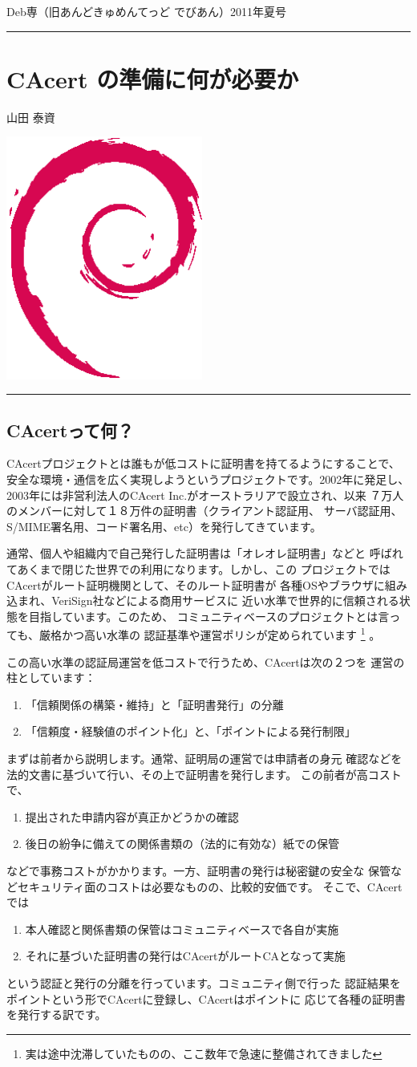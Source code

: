 \documentclass[mingoth,a4paper]{jsarticle}
\renewcommand{\dancersection}[2]{%
\newpage
Deb専（旧あんどきゅめんてっど でびあん）2011年夏号
%
\vspace{0.1mm}\\
{\color{dancerdarkblue}\rule{\hsize}{2mm}}

%
%
\begin{minipage}[t]{0.6\hsize}
\color{dancerdarkblue}
\vspace{1cm}
\section{#1}
\hfill{}#2\\
\end{minipage}
\begin{minipage}[t]{0.4\hsize}
\vspace{-2cm}
\hfill{}\includegraphics[height=8cm]{image200502/openlogo-nd.eps}\\
\vspace{-5cm}
\end{minipage}
%
{\color{dancerlightblue}\rule{0.66\hsize}{2mm}}
%
\vspace{2cm}
}
\begin{document}
\dancersection{CAcert の準備に何が必要か}{山田 泰資}


\subsection{CAcertって何？}
CAcertプロジェクトとは誰もが低コストに証明書を持てるようにすることで、
安全な環境・通信を広く実現しようというプロジェクトです。2002年に発足し、
2003年には非営利法人のCAcert Inc.がオーストラリアで設立され、以来
７万人のメンバーに対して１８万件の証明書（クライアント認証用、
サーバ認証用、S/MIME署名用、コード署名用、etc）を発行してきています。

通常、個人や組織内で自己発行した証明書は「オレオレ証明書」などと
呼ばれてあくまで閉じた世界での利用になります。しかし、この
プロジェクトではCAcertがルート証明機関として、そのルート証明書が
各種OSやブラウザに組み込まれ、VeriSign社などによる商用サービスに
近い水準で世界的に信頼される状態を目指しています。このため、
コミュニティベースのプロジェクトとは言っても、厳格かつ高い水準の
認証基準や運営ポリシが定められています
\footnote{実は途中沈滞していたものの、ここ数年で急速に整備されてきました}
。

この高い水準の認証局運営を低コストで行うため、CAcertは次の２つを
運営の柱としています：
\begin{enumerate}
\item 「信頼関係の構築・維持」と「証明書発行」の分離
\item 「信頼度・経験値のポイント化」と、「ポイントによる発行制限」
\end{enumerate}

まずは前者から説明します。通常、証明局の運営では申請者の身元
確認などを法的文書に基づいて行い、その上で証明書を発行します。
この前者が高コストで、
\begin{enumerate}
\item 提出された申請内容が真正かどうかの確認
\item 後日の紛争に備えての関係書類の（法的に有効な）紙での保管
\end{enumerate}
などで事務コストがかかります。一方、証明書の発行は秘密鍵の安全な
保管などセキュリティ面のコストは必要なものの、比較的安価です。
そこで、CAcertでは
\begin{enumerate}
\item 本人確認と関係書類の保管はコミュニティベースで各自が実施
\item それに基づいた証明書の発行はCAcertがルートCAとなって実施
\end{enumerate}
という認証と発行の分離を行っています。コミュニティ側で行った
認証結果をポイントという形でCAcertに登録し、CAcertはポイントに
応じて各種の証明書を発行する訳です。
\end{document}
